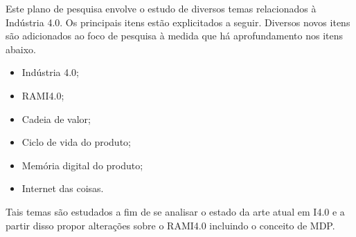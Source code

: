 	Este plano de pesquisa envolve o estudo de diversos temas relacionados à Indústria 4.0. Os principais itens estão explicitados a seguir. Diversos novos itens são adicionados ao foco de pesquisa à medida que há aprofundamento nos itens abaixo.
	
	\begin{itemize}
		\item Indústria 4.0;
		\item RAMI4.0;
		\item Cadeia de valor;
		\item Ciclo de vida do produto;
		\item Memória digital do produto;
		\item Internet das coisas.
	\end{itemize}
	
	Tais temas são estudados a fim de se analisar o estado da arte atual em I4.0 e a partir disso propor alterações sobre o RAMI4.0 incluindo o conceito de MDP.




































	
	
	

	
	
	



